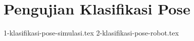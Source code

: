 \section{Pengujian Klasifikasi Pose}
\label{sec:pengujianklasifikasipose}

\textcolor{red}{\lipsum[1-2]}

{1-klasifikasi-pose-simulasi.tex}
{2-klasifikasi-pose-robot.tex}
